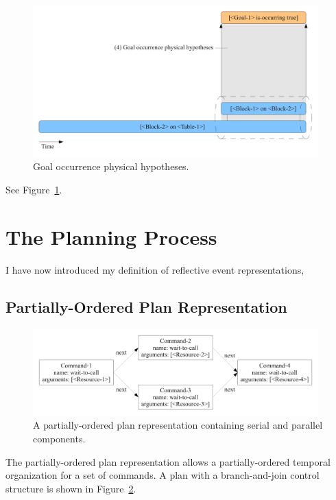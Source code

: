 \begin{figure}[bth]
  \center
  \includegraphics[width=11cm]{gfx/learning_to_plan-4-goal_occurrence_physical_hypotheses}
  \caption[Goal occurrence physical hypotheses]{Goal occurrence physical hypotheses.}
  \label{fig:goal_occurrence_physical_hypotheses}
\end{figure}

See Figure~\ref{fig:goal_occurrence_physical_hypotheses}.



\section{The Planning Process}

I have now introduced my definition of reflective event representations, 

\subsection{Partially-Ordered Plan Representation}

\begin{figure}[bth]
  \center
  \includegraphics[width=11cm]{gfx/serial_and_parallel_plan}
  \caption[A partially-ordered plan with serial and parallel
    components]{A partially-ordered plan representation containing
    serial and parallel components.}
  \label{fig:serial_and_parallel_plan}
\end{figure}

The partially-ordered plan representation allows a partially-ordered
temporal organization for a set of commands.  A plan with a
branch-and-join control structure is shown in
Figure~\ref{fig:serial_and_parallel_plan}.


